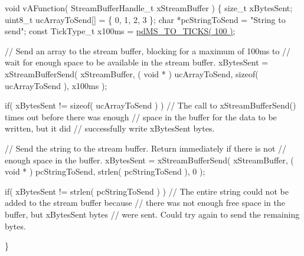 \begin{DoxyPre}
void vAFunction( StreamBufferHandle\_t xStreamBuffer )
\{
size\_t xBytesSent;
uint8\_t ucArrayToSend[] = \{ 0, 1, 2, 3 \};
char *pcStringToSend = "String to send";
const TickType\_t x100ms = \hyperlink{projdefs_8h_a353d0f62b82a402cb3db63706c81ec3f}{pdMS\_TO\_TICKS( 100 )};
\begin{DoxyVerb}// Send an array to the stream buffer, blocking for a maximum of 100ms to
// wait for enough space to be available in the stream buffer.
xBytesSent = xStreamBufferSend( xStreamBuffer, ( void * ) ucArrayToSend, sizeof( ucArrayToSend ), x100ms );

if( xBytesSent != sizeof( ucArrayToSend ) )
{
    // The call to xStreamBufferSend() times out before there was enough
    // space in the buffer for the data to be written, but it did
    // successfully write xBytesSent bytes.
}

// Send the string to the stream buffer.  Return immediately if there is not
// enough space in the buffer.
xBytesSent = xStreamBufferSend( xStreamBuffer, ( void * ) pcStringToSend, strlen( pcStringToSend ), 0 );

if( xBytesSent != strlen( pcStringToSend ) )
{
    // The entire string could not be added to the stream buffer because
    // there was not enough free space in the buffer, but xBytesSent bytes
    // were sent.  Could try again to send the remaining bytes.
}
\end{DoxyVerb}

\}
\end{DoxyPre}
 